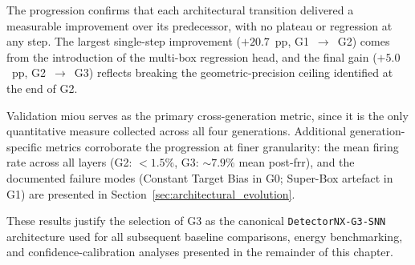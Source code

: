The progression confirms that each architectural transition delivered a measurable improvement over its predecessor, with no plateau or regression at any step.
The largest single-step improvement ($+20.7$~pp, G1~$\rightarrow$~G2) comes from the introduction of the multi-box regression head, and the final gain ($+5.0$~pp, G2~$\rightarrow$~G3) reflects breaking the geometric-precision ceiling identified at the end of G2.

Validation \gls{miou} serves as the primary cross-generation metric, since it is the only quantitative measure collected across all four generations.
Additional generation-specific metrics corroborate the progression at finer granularity: the mean firing rate across all layers (G2: $<1.5\%$, G3: $\sim7.9\%$ mean post-\gls{frr}), and the documented failure modes (Constant Target Bias in G0; Super-Box artefact in G1) are presented in Section~\ref{sec:architectural_evolution}.

These results justify the selection of G3 as the canonical \texttt{DetectorNX-G3-SNN} architecture used for all subsequent baseline comparisons, energy benchmarking, and confidence-calibration analyses presented in the remainder of this chapter.